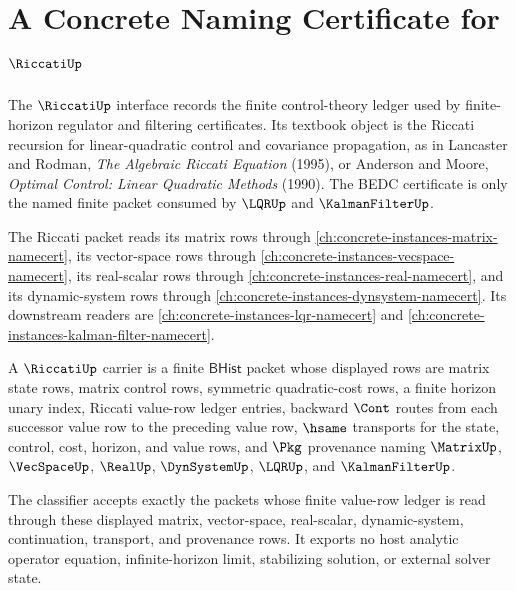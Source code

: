 \chapter{A Concrete Naming Certificate for $\RiccatiUp$}
\label{ch:concrete-instances-riccati-namecert}

The $\RiccatiUp$ interface records the finite control-theory ledger used by
finite-horizon regulator and filtering certificates. Its textbook object is
the Riccati recursion for linear-quadratic control and covariance propagation,
as in Lancaster and Rodman, \emph{The Algebraic Riccati Equation} (1995), or
Anderson and Moore, \emph{Optimal Control: Linear Quadratic Methods} (1990).
The BEDC certificate is only the named finite packet consumed by $\LQRUp$ and
$\KalmanFilterUp$.

The Riccati packet reads its matrix rows through
\autoref{ch:concrete-instances-matrix-namecert}, its vector-space rows through
\autoref{ch:concrete-instances-vecspace-namecert}, its real-scalar rows through
\autoref{ch:concrete-instances-real-namecert}, and its dynamic-system rows
through \autoref{ch:concrete-instances-dynsystem-namecert}. Its downstream
readers are \autoref{ch:concrete-instances-lqr-namecert} and
\autoref{ch:concrete-instances-kalman-filter-namecert}.

\begin{definition}
\label{def:riccati-control-packet-carrier}
A $\RiccatiUp$ carrier is a finite $\mathsf{BHist}$ packet whose displayed rows
are matrix state rows, matrix control rows, symmetric quadratic-cost rows, a
finite horizon unary index, Riccati value-row ledger entries, backward $\Cont$
routes from each successor value row to the preceding value row, $\hsame$
transports for the state, control, cost, horizon, and value rows, and $\Pkg$
provenance naming $\MatrixUp$, $\VecSpaceUp$, $\RealUp$, $\DynSystemUp$,
$\LQRUp$, and $\KalmanFilterUp$.

The classifier accepts exactly the packets whose finite value-row ledger is read
through these displayed matrix, vector-space, real-scalar, dynamic-system,
continuation, transport, and provenance rows. It exports no host analytic
operator equation, infinite-horizon limit, stabilizing solution, or external
solver state.
\end{definition}

